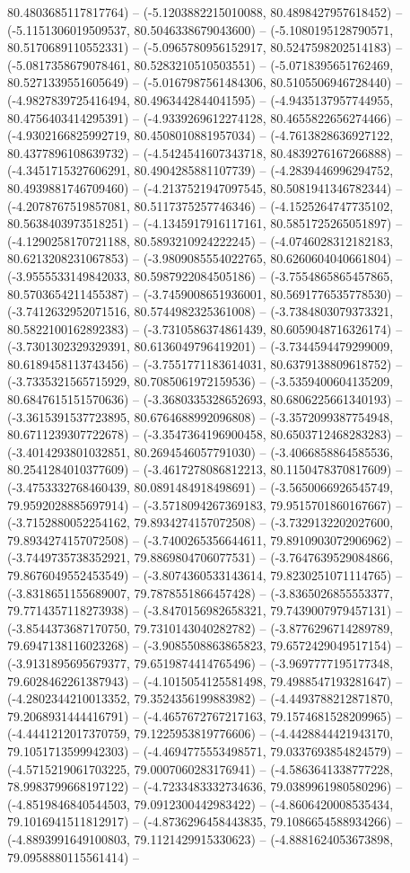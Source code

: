 80.4803685117817764) -- (-5.1203882215010088, 80.4898427957618452) -- (-5.1151306019509537, 80.5046338679043600) -- (-5.1080195128790571, 80.5170689110552331) -- (-5.0965780956152917, 80.5247598202514183) -- (-5.0817358679078461, 80.5283210510503551) -- (-5.0718395651762469, 80.5271339551605649) -- (-5.0167987561484306, 80.5105506946728440) -- (-4.9827839725416494, 80.4963442844041595) -- (-4.9435137957744955, 80.4756403414295391) -- (-4.9339269612274128, 80.4655822656274466) -- (-4.9302166825992719, 80.4508010881957034) -- (-4.7613828636927122, 80.4377896108639732) -- (-4.5424541607343718, 80.4839276167266888) -- (-4.3451715327606291, 80.4904285881107739) -- (-4.2839446996294752, 80.4939881746709460) -- (-4.2137521947097545, 80.5081941346782344) -- (-4.2078767519857081, 80.5117375257746346) -- (-4.1525264747735102, 80.5638403973518251) -- (-4.1345917916117161, 80.5851725265051897) -- (-4.1290258170721188, 80.5893210924222245) -- (-4.0746028312182183, 80.6213208231067853) -- (-3.9809085554022765, 80.6260604040661804) -- (-3.9555533149842033, 80.5987922084505186) -- (-3.7554865865457865, 80.5703654211455387) -- (-3.7459008651936001, 80.5691776535778530) -- (-3.7412632952071516, 80.5744982325361008) -- (-3.7384803079373321, 80.5822100162892383) -- (-3.7310586374861439, 80.6059048716326174) -- (-3.7301302329329391, 80.6136049796419201) -- (-3.7344594479299009, 80.6189458113743456) -- (-3.7551771183614031, 80.6379138809618752) -- (-3.7335321565715929, 80.7085061972159536) -- (-3.5359400604135209, 80.6847615151570636) -- (-3.3680335328652693, 80.6806225661340193) -- (-3.3615391537723895, 80.6764688992096808) -- (-3.3572099387754948, 80.6711239307722678) -- (-3.3547364196900458, 80.6503712468283283) -- (-3.4014293801032851, 80.2694546057791030) -- (-3.4066858864585536, 80.2541284010377609) -- (-3.4617278086812213, 80.1150478370817609) -- (-3.4753332768460439, 80.0891484918498691) -- (-3.5650066926545749, 79.9592028885697914) -- (-3.5718094267369183, 79.9515701860167667) -- (-3.7152880052254162, 79.8934274157072508) -- (-3.7329132202027600, 79.8934274157072508) -- (-3.7400265356644611, 79.8910903072906962) -- (-3.7449735738352921, 79.8869804706077531) -- (-3.7647639529084866, 79.8676049552453549) -- (-3.8074360533143614, 79.8230251071114765) -- (-3.8318651155689007, 79.7878551866457428) -- (-3.8365026855553377, 79.7714357118273938) -- (-3.8470156982658321, 79.7439007979457131) -- (-3.8544373687170750, 79.7310143040282782) -- (-3.8776296714289789, 79.6947138116023268) -- (-3.9085508863865823, 79.6572429049517154) -- (-3.9131895695679377, 79.6519874414765496) -- (-3.9697777195177348, 79.6028462261387943) -- (-4.1015054125581498, 79.4988547193281647) -- (-4.2802344210013352, 79.3524356199883982) -- (-4.4493788212871870, 79.2068931444416791) -- (-4.4657672767217163, 79.1574681528209965) -- (-4.4441212017370759, 79.1225953819776606) -- (-4.4428844421943170, 79.1051713599942303) -- (-4.4694775553498571, 79.0337693854824579) -- (-4.5715219061703225, 79.0007060283176941) -- (-4.5863641338777228, 78.9983799668197122) -- (-4.7233483332734636, 79.0389961980580296) -- (-4.8519846840544503, 79.0912300442983422) -- (-4.8606420008535434, 79.1016941511812917) -- (-4.8736296458443835, 79.1086654588934266) -- (-4.8893991649100803, 79.1121429915330623) -- (-4.8881624053673898, 79.0958880115561414) -- 
